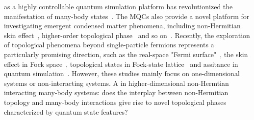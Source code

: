\documentclass[longbibliography, aps, prx, amsmath, amssymb, amsfonts, twocolumn,superscriptaddress, footinbib]{revtex4-1}
\begin{document}
	{} as a highly controllable quantum simulation platform has revolutionized the manifestation of many-body states~\cite{skinner2019measurement,nahum2017quantum,gullans2020dynamical,koh2023measurement,li2023cross,choi2020quantum,minato2022fate,yang2025bridging,potter2022entanglement,iqbal2024non,zhang2025physics}. 
	The MQCs also provide a novel platform for investigating emergent condensed matter phenomena, including non-Hermitian skin effect~\cite{fleckenstein2022non}, higher-order topological phase~\cite{koh2024realization} and so on~\cite{iqbal2024non}. Recently, the exploration of topological phenomena beyond single-particle fermions represents a particularly promising direction, such as the real-space "Fermi surface"~\cite{shen2025observation}, the skin effect in Fock space~\cite{shen2024enhanced,shimomura2024general}, topological states in Fock-state lattice~\cite{deng2022observing} and assitance in quantum simulation~\cite{zhao2025}. However, these studies mainly focus on one-dimensional systems or non-interacting systems. A {\color{blue}{critical question raises}} in higher-dimensional non-Hermtian interacting many-body systems: does the interplay between non-Hermitian topology and many-body interactions give rise to novel topological phases characterized by quantum state features? 
\end{document}
